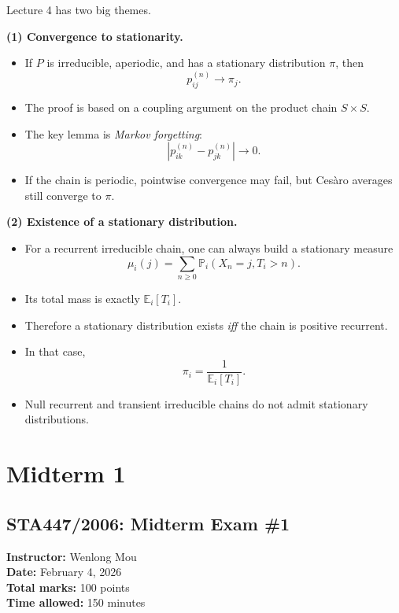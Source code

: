 \documentclass[11pt]{article}
\theoremstyle{definition}
\begin{document}
\begin{summarybox}
Lecture 4 has two big themes.

\textbf{(1) Convergence to stationarity.}
\begin{itemize}[leftmargin=2em]
    \item If \(P\) is irreducible, aperiodic, and has a stationary distribution \(\pi\), then
    \[
    p_{ij}^{(n)}\to \pi_j.
    \]
    \item The proof is based on a coupling argument on the product chain \(S\times S\).
    \item The key lemma is \emph{Markov forgetting}:
    \[
    \left|p_{ik}^{(n)}-p_{jk}^{(n)}\right|\to 0.
    \]
    \item If the chain is periodic, pointwise convergence may fail, but Ces\`aro averages still converge to \(\pi\).
\end{itemize}

\textbf{(2) Existence of a stationary distribution.}
\begin{itemize}[leftmargin=2em]
    \item For a recurrent irreducible chain, one can always build a stationary measure
    \[
    \mu_i(j)=\sum_{n\ge 0}\mathbb P_i(X_n=j, T_i>n).
    \]
    \item Its total mass is exactly \(\mathbb E_i[T_i]\).
    \item Therefore a stationary distribution exists \emph{iff} the chain is positive recurrent.
    \item In that case,
    \[
    \pi_i = \frac{1}{\mathbb E_i[T_i]}.
    \]
    \item Null recurrent and transient irreducible chains do not admit stationary distributions.
\end{itemize}
\end{summarybox}

\clearpage

\section{Midterm 1}

\subsection*{STA447/2006: Midterm Exam \#1}
\textbf{Instructor:} Wenlong Mou\\
\textbf{Date:} February 4, 2026\\
\textbf{Total marks:} 100 points\\
\textbf{Time allowed:} 150 minutes
\end{document}
